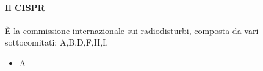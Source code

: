 \paragraph{Il CISPR} È la commissione internazionale sui radiodisturbi, composta da vari sottocomitati: A,B,D,F,H,I.
\begin{itemize}
 \item A
\end{itemize}



